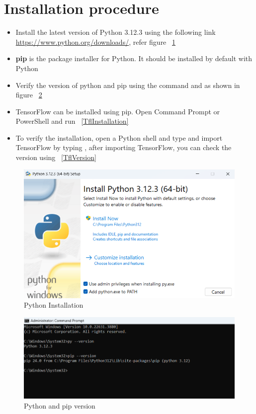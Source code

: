 \section{Installation procedure}
\begin{itemize}
	\item Install the latest version of Python 3.12.3 using the following link \url{https://www.python.org/downloads/}, refer figure ~\ref{PythonInstallation}
	\item \textbf{pip} is the package installer for Python. It should be installed by default with Python
	\item Verify the version of python and pip using the command  and  as shown in figure ~\ref{version}
	\item TensorFlow can be installed using pip. Open Command Prompt or PowerShell and run  ~\ref{TflInstallation}
	\item To verify the installation, open a Python shell and type  and import TensorFlow by typing , after importing TensorFlow, you can check the version using   ~\ref{TflVersion} \cite{tflInstallation:2024}
\end{itemize}

\begin{figure}
	\begin{center}
		\includegraphics[width=0.7\linewidth]{Images/TensorFlowLite/PythonInstallation312.png}
		\caption{Python Installation}
		\label{PythonInstallation}
	\end{center}
\end{figure}

\begin{figure}
	\begin{center}
		\includegraphics[width=0.7\linewidth]{Images/TensorFlowLite/pythonversion.png}
		\caption{Python and pip version}
		\label{version}
	\end{center}
\end{figure}

